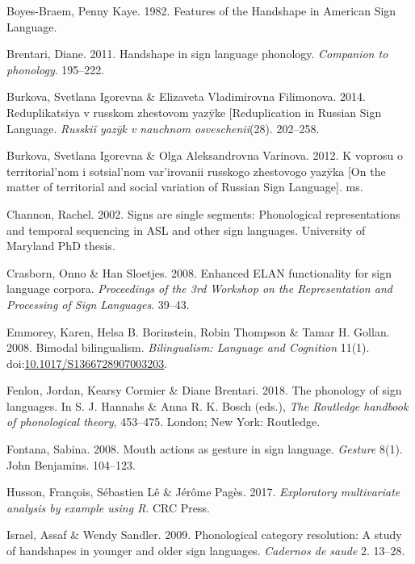 \leavevmode\hypertarget{ref-Boyes:1982}{}%
Boyes-Braem, Penny Kaye. 1982. Features of the Handshape in American
Sign Language.

\leavevmode\hypertarget{ref-Brentari:2011}{}%
Brentari, Diane. 2011. Handshape in sign language phonology.
\emph{Companion to phonology}. 195--222.

\leavevmode\hypertarget{ref-Burkova:2014}{}%
Burkova, Svetlana Igorevna \& Elizaveta Vladimirovna Filimonova. 2014.
Reduplikatsiya v russkom zhestovom yazȳke {[}Reduplication in Russian
Sign Language. \emph{Russkiĭ yazȳk v nauchnom osveschenii}(28).
202--258.

\leavevmode\hypertarget{ref-Burkova:2012}{}%
Burkova, Svetlana Igorevna \& Olga Aleksandrovna Varinova. 2012. K
voprosu o territorial'nom i sotsial'nom var'irovanii russkogo zhestovogo
yazȳka {[}On the matter of territorial and social variation of Russian
Sign Language{]}. ms.

\leavevmode\hypertarget{ref-Channon:2002}{}%
Channon, Rachel. 2002. Signs are single segments: Phonological
representations and temporal sequencing in ASL and other sign languages.
University of Maryland PhD thesis.

\leavevmode\hypertarget{ref-Crasborn:2008}{}%
Crasborn, Onno \& Han Sloetjes. 2008. Enhanced ELAN functionality for
sign language corpora. \emph{Proceedings of the 3rd Workshop on the
Representation and Processing of Sign Languages}. 39--43.

\leavevmode\hypertarget{ref-Emmorey:2008}{}%
Emmorey, Karen, Helsa B. Borinstein, Robin Thompson \& Tamar H. Gollan.
2008. Bimodal bilingualism. \emph{Bilingualism: Language and Cognition}
11(1).
doi:\href{https://doi.org/10.1017/S1366728907003203}{10.1017/S1366728907003203}.

\leavevmode\hypertarget{ref-Fenlon:2018}{}%
Fenlon, Jordan, Kearsy Cormier \& Diane Brentari. 2018. The phonology of
sign languages. In S. J. Hannahs \& Anna R. K. Bosch (eds.), \emph{The
Routledge handbook of phonological theory}, 453--475. London; New York:
Routledge.

\leavevmode\hypertarget{ref-Fontana:2008}{}%
Fontana, Sabina. 2008. Mouth actions as gesture in sign language.
\emph{Gesture} 8(1). John Benjamins. 104--123.

\leavevmode\hypertarget{ref-Husson:2017}{}%
Husson, François, Sébastien Lê \& Jérôme Pagès. 2017. \emph{Exploratory
multivariate analysis by example using R}. CRC Press.

\leavevmode\hypertarget{ref-Israel:2009}{}%
Israel, Assaf \& Wendy Sandler. 2009. Phonological category resolution:
A study of handshapes in younger and older sign languages.
\emph{Cadernos de saude} 2. 13--28.

